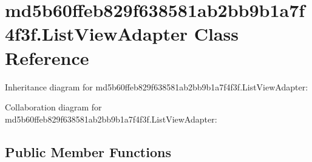 \hypertarget{classmd5b60ffeb829f638581ab2bb9b1a7f4f3f_1_1_list_view_adapter}{}\section{md5b60ffeb829f638581ab2bb9b1a7f4f3f.\+List\+View\+Adapter Class Reference}
\label{classmd5b60ffeb829f638581ab2bb9b1a7f4f3f_1_1_list_view_adapter}


Inheritance diagram for md5b60ffeb829f638581ab2bb9b1a7f4f3f.\+List\+View\+Adapter\+:


Collaboration diagram for md5b60ffeb829f638581ab2bb9b1a7f4f3f.\+List\+View\+Adapter\+:
\subsection*{Public Member Functions}
